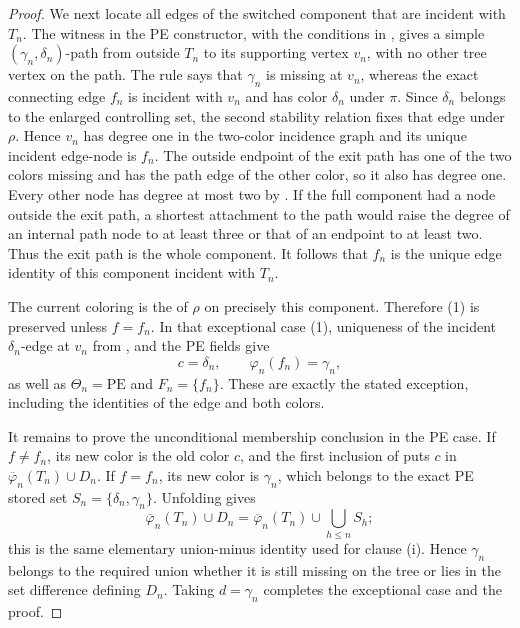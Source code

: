 \begin{proof}
We next locate all edges of the switched component that are incident with
\(T_n\).  The  witness in the PE constructor, with the
conditions in , gives a simple
\((\gamma_n,\delta_n)\)-path from outside \(T_n\) to its supporting
vertex \(v_n\), with no other tree vertex on the path.  The rule
 says that \(\gamma_n\) is missing at
\(v_n\), whereas the exact connecting edge
\(f_n\) is incident with \(v_n\) and has color \(\delta_n\) under
\(\pi\).  Since \(\delta_n\) belongs to the enlarged controlling set,
the second stability relation fixes that edge under \(\rho\).  Hence
\(v_n\) has degree one in the two-color incidence graph and its unique
incident edge-node is \(f_n\).  The outside endpoint of the exit path has
one of the two colors missing and has the path edge of the other color, so
it also has degree one.  Every other node has degree at most two by
.  If the full component had a
node outside the exit path, a shortest attachment to the path would raise
the degree of an internal path node to at least three or that of an
endpoint to at least two.  Thus the exit path is the whole component.  It
follows that \(f_n\) is the unique edge identity of this component incident
with \(T_n\).

The current coloring is the  of \(\rho\)
on precisely this component.  Therefore (1) is preserved unless
\(f=f_n\).  In that exceptional case (1), uniqueness of the incident
\(\delta_n\)-edge at \(v_n\) from , and the
PE fields give
\[
 c=\delta_n,\qquad \varphi_n(f_n)=\gamma_n,
\]
as well as \(\Theta_n=\mathrm{PE}\) and \(F_n=\{f_n\}\).  These are
exactly the stated exception, including the identities of the edge and
both colors.

It remains to prove the unconditional membership conclusion in the PE
case.  If \(f\ne f_n\), its new color is the old color \(c\), and the
first inclusion of  puts \(c\) in
\(\overline\varphi_n(T_n)\cup D_n\).  If \(f=f_n\), its new color is
\(\gamma_n\), which belongs to the exact PE stored set
\(S_n=\{\delta_n,\gamma_n\}\).  Unfolding
 gives
\[
 \overline\varphi_n(T_n)\cup D_n
 =\overline\varphi_n(T_n)\cup\bigcup_{h\leq n}S_h;
\]
this is the same elementary union-minus identity used for clause (i).
Hence \(\gamma_n\) belongs to the required union whether it is still
missing on the tree or lies in the set difference defining \(D_n\).
Taking \(d=\gamma_n\) completes the exceptional case and the proof.
\end{proof}

